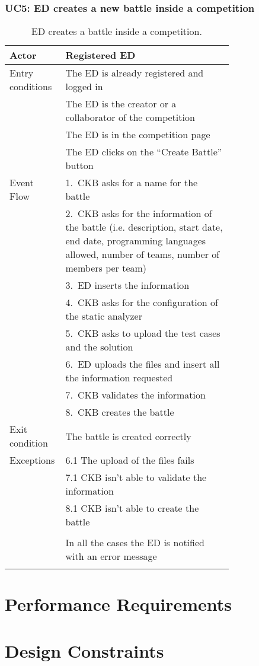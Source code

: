 \subsubsection*{UC5: ED creates a new battle inside a competition}
\begin{center}
  \begin{longtable}{l|p{0.75\linewidth}}
    \hline
    Actor & Registered ED \\
    \hline
    Entry conditions & The ED is already registered and logged in  \\
    & The ED is the creator or a collaborator of the competition \\
    & The ED is in the competition page \\
    & The ED clicks on the “Create Battle” button \\
    \hline
    Event Flow & 1.\ CKB asks for a name for the battle \\
    & 2.\ CKB asks for the information of the battle (i.e. description, start date, end date, programming languages allowed, number of teams, number of members per team) \\
    & 3.\ ED inserts the information \\
    & 4.\ CKB asks for the configuration of the static analyzer \\
    & 5.\ CKB asks to upload the test cases and the solution \\
    & 6.\ ED uploads the files and insert all the information requested \\
    & 7.\ CKB validates the information \\
    & 8.\ CKB creates the battle \\
    \hline
    Exit condition & The battle is created correctly \\
    \hline
    Exceptions & 6.1 The upload of the files fails \\
    & 7.1 CKB isn’t able to validate the information \\
    & 8.1 CKB isn’t able to create the battle \\ \\
    & In all the cases the ED is notified with an error message \\
    \hline
    \caption{ED creates a battle inside a competition.}
    \label{tab: ED_create_battle}
  \end{longtable}
\end{center}


\section{Performance Requirements}
\label{s:Performance_requirements}%

\section{Design Constraints}
\label{s:Design_constraints}%


